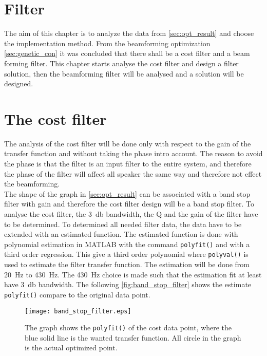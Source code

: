 \section{Filter}\label{sec:filter_design}

The aim of this chapter is to analyze the data from \ref{sec:opt_result} and choose the implementation method. From the beamforming optimization \autoref{sec:genetic_con} it was concluded that there shall be a cost filter and a beam forming filter. This chapter starts analyse the cost filter and design a filter solution, then the beamforming filter will be analysed and a solution will be designed.


\section{The cost filter}
The analysis of the cost filter will be done only with respect to the gain of the transfer function and without taking the phase intro account. The reason to avoid the phase is that the filter is an input filter to the entire system, and therefore the phase of the filter will affect all speaker the same way and therefore not effect the beamforming. \\
The shape of the graph in \ref{sec:opt_result} can be associated with a band stop filter with gain and therefore the cost filter design will be a band stop filter. To analyse the cost filter, the \SI{3}{\decibel} bandwidth, the Q and the gain of the filter have to be determined. To determined all needed filter data, the data have to be extended with an estimated function. The estimated function is done with polynomial estimation in MATLAB with the command \texttt{polyfit()} and with a third order regression. This give a third order polynomial where  \texttt{polyval()} is used to estimate the filter transfer function. The estimation will be done from \SI{20}{\hertz} to \SI{430}{\hertz}. The \SI{430}{\hertz} choice is made such that the estimation fit at least have \SI{3}{\decibel} bandwidth. The following \autoref{fig:band_stop_filter} shows the estimate  \texttt{polyfit()} compare to the original data point.

\begin{figure}[H]
	\centering
	\texttt{[image: band\_stop\_filter.eps]}
	\caption{The graph shows the \texttt{polyfit()} of the cost data point, where the blue solid line is the wanted transfer function. All circle in the graph is the actual optimized point.}
		\label{fig:band_stop_filter}
\end{figure}

